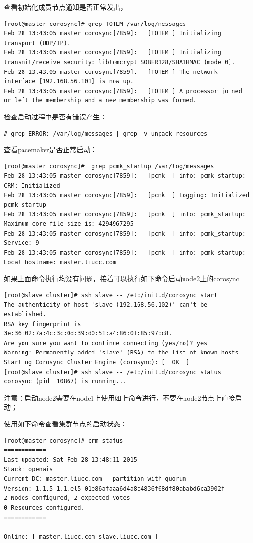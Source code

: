 查看初始化成员节点通知是否正常发出，
\begin{verbatim}
[root@master corosync]# grep TOTEM /var/log/messages
Feb 28 13:43:05 master corosync[7859]:   [TOTEM ] Initializing transport (UDP/IP).
Feb 28 13:43:05 master corosync[7859]:   [TOTEM ] Initializing transmit/receive security: libtomcrypt SOBER128/SHA1HMAC (mode 0).
Feb 28 13:43:05 master corosync[7859]:   [TOTEM ] The network interface [192.168.56.101] is now up.
Feb 28 13:43:05 master corosync[7859]:   [TOTEM ] A processor joined or left the membership and a new membership was formed.
\end{verbatim}

检查启动过程中是否有错误产生：
\begin{verbatim}
# grep ERROR: /var/log/messages | grep -v unpack_resources
\end{verbatim}

查看pacemaker是否正常启动：
\begin{verbatim}
[root@master corosync]#  grep pcmk_startup /var/log/messages
Feb 28 13:43:05 master corosync[7859]:   [pcmk  ] info: pcmk_startup: CRM: Initialized
Feb 28 13:43:05 master corosync[7859]:   [pcmk  ] Logging: Initialized pcmk_startup
Feb 28 13:43:05 master corosync[7859]:   [pcmk  ] info: pcmk_startup: Maximum core file size is: 4294967295
Feb 28 13:43:05 master corosync[7859]:   [pcmk  ] info: pcmk_startup: Service: 9
Feb 28 13:43:05 master corosync[7859]:   [pcmk  ] info: pcmk_startup: Local hostname: master.liucc.com
\end{verbatim}

如果上面命令执行均没有问题，接着可以执行如下命令启动node2上的corosync
\begin{verbatim}
[root@slave cluster]# ssh slave -- /etc/init.d/corosync start
The authenticity of host 'slave (192.168.56.102)' can't be established.
RSA key fingerprint is 3e:36:02:7a:4c:3c:0d:39:d0:51:a4:86:0f:85:97:c8.
Are you sure you want to continue connecting (yes/no)? yes
Warning: Permanently added 'slave' (RSA) to the list of known hosts.
Starting Corosync Cluster Engine (corosync): [  OK  ]
[root@slave cluster]# ssh slave -- /etc/init.d/corosync status
corosync (pid  10867) is running...
\end{verbatim}

注意：启动node2需要在node1上使用如上命令进行，不要在node2节点上直接启动；

使用如下命令查看集群节点的启动状态：
\begin{verbatim}
[root@master corosync]# crm status
============
Last updated: Sat Feb 28 13:48:11 2015
Stack: openais
Current DC: master.liucc.com - partition with quorum
Version: 1.1.5-1.1.el5-01e86afaaa6d4a8c4836f68df80ababd6ca3902f
2 Nodes configured, 2 expected votes
0 Resources configured.
============

Online: [ master.liucc.com slave.liucc.com ]

\end{verbatim}

